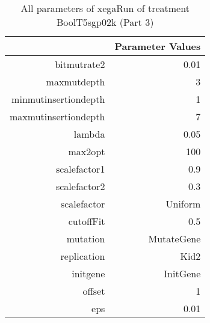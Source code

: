 \begin{table}[ht]
\centering
\begin{tabular}{rr}
  \hline
 & Parameter Values \\ 
  \hline
bitmutrate2 & 0.01 \\ 
  maxmutdepth & 3 \\ 
  minmutinsertiondepth & 1 \\ 
  maxmutinsertiondepth & 7 \\ 
  lambda & 0.05 \\ 
  max2opt & 100 \\ 
  scalefactor1 & 0.9 \\ 
  scalefactor2 & 0.3 \\ 
  scalefactor & Uniform \\ 
  cutoffFit & 0.5 \\ 
  mutation & MutateGene \\ 
  replication & Kid2 \\ 
  initgene & InitGene \\ 
  offset & 1 \\ 
  eps & 0.01 \\ 
   \hline
\end{tabular}
\caption{ All parameters of xegaRun of treatment BoolT5sgp02k 
 (Part 3)} 
\end{table}

